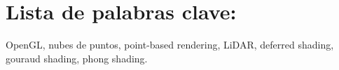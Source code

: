 %
%

\section*{Lista de palabras clave:}

OpenGL, nubes de puntos, point-based rendering, LiDAR, deferred shading, gouraud shading, phong shading.


